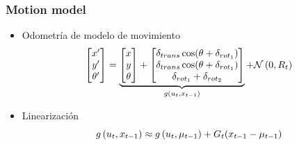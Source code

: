 \begin{frame}
	\frametitle{Motion model}
	
	\begin{itemize}
		\item Odometría de modelo de movimiento
		\begin{equation*}
			\begin{bmatrix}
				x^{\prime} \\
				y^{\prime} \\
				\theta^{\prime}
			\end{bmatrix} =
			\underbrace{
				\begin{bmatrix}
				x \\
				y \\
				\theta
			\end{bmatrix} +
			\begin{bmatrix}
				\delta_{trans}\cos(\theta+\delta_{rot_{1}}) \\
				\delta_{trans}\cos(\theta+\delta_{rot_{1}}) \\
				\delta_{rot_{1}} + \delta_{rot_{2}}
			\end{bmatrix}
			}_{g\left( u_{t}, x_{t-1} \right)} + \mathcal{N}\left( {0}, {R_{t}} \right)
		\end{equation*}
		\item Linearización
		\begin{equation*}
			g\left( u_{t}, x_{t-1} \right) \approx 			g\left( u_{t}, \mu_{t-1} \right) + G_{t}(x_{t-1}-\mu_{t-1})
		\end{equation*}
	\end{itemize}
	
\end{frame}

